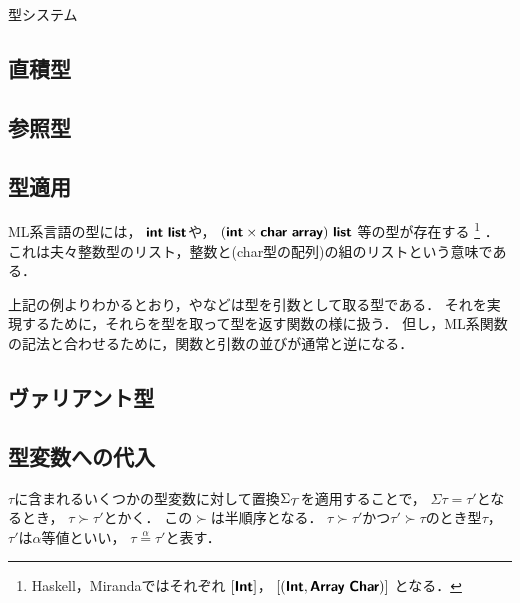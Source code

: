 \documentclass[a4paper,titlepage,report]{jsbook}
\begin{document}
\begin{resbonsiblesection}{型システム}{\sakamoto}
\subsection{直積型}\label{ssc:type-tuple}
\subsection{参照型}\label{ssc:type-reference}

\subsection{型適用}\label{ssc:type-apply}
ML系言語の型には，
$\typename{int}\ \typename{list}$や，
$(\typename{int}\times\typename{char}\ \typename{array})\ \typename{list}$
等の型が存在する
\footnote{
    Haskell，Mirandaではそれぞれ
    $[\text{\sffamily\bfseries Int}]$，
    $[(\typename{Int}, \typename{Array}\ \typename{Char})]$
    となる．
    }
．
これは夫々整数型のリスト，整数と(char型の配列)の組のリストという意味である．

上記の例よりわかるとおり，やなどは型を引数として取る型である．
それを実現するために，それらを型を取って型を返す関数の様に扱う．
但し，ML系関数の記法と合わせるために，関数と引数の並びが通常と逆になる．

\subsection{ヴァリアント型}\label{ssc:type-variant}


\subsection{型変数への代入}\label{ssc:type-order}
$\tau$に含まれるいくつかの型変数に対して置換${\Sigma_{\mathcal{T}}}$を適用することで，
$\Sigma\tau=\tau'$となるとき，
$\tau\succ\tau'$とかく．
この$\succ$は半順序となる．
$\tau\succ\tau'$かつ$\tau'\succ\tau$のとき型$\tau$，$\tau'$は$\alpha$等値といい，
$\tau\mathrel{\overset{\alpha}{=}}\tau'$と表す．
\end{resbonsiblesection}
\end{document}
